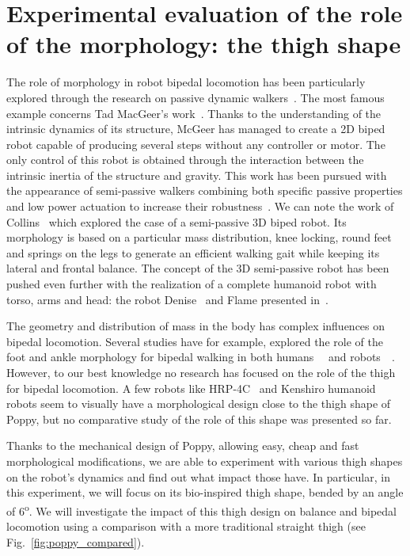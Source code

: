
\newpage
\section{Experimental evaluation of the role of the morphology: the thigh shape} %
\label{sec:morphology-role}

The role of morphology in robot bipedal locomotion has been particularly explored through the research on passive dynamic walkers~\cite{wisse2007passive}. The most famous example concerns Tad MacGeer's work~\cite{mcgeer1990passive}. Thanks to the understanding of the intrinsic dynamics of its structure, McGeer has managed to create a 2D biped robot capable of producing several steps without any controller or motor.
The only control of this robot is obtained through the interaction between the intrinsic inertia of the structure and gravity.
This work has been pursued with the appearance of semi-passive walkers combining both specific passive properties and low power actuation to increase their robustness~\cite{Anderson2005}. We can note the work of Collins~\cite{collins2005bipedal} which explored the case of a semi-passive 3D biped robot. Its morphology is based on a particular mass distribution, knee locking, round feet and springs on the legs to generate an efficient walking gait while keeping its lateral and frontal balance.
The concept of the 3D semi-passive robot has been pushed even further with the realization of a complete humanoid robot with torso, arms and head: the robot Denise~\cite{wisse2005three} and Flame presented in~\cite{Hobbelen2008}.

The geometry and distribution of mass in the body has complex influences on bipedal locomotion. Several studies have for example, explored the role of the foot and ankle morphology for bipedal walking in both humans~\cite{Adamczyk2006}~\cite{Hughes1990} and robots~\cite{hobbelen2005ankle}~\cite{Davis2010}. However, to our best knowledge no research has focused on the role of the thigh for bipedal locomotion.  A few robots like HRP-4C~\cite{kaneko2009cybernetic} and Kenshiro humanoid~\cite{nakanishi2013design} robots seem to visually have a morphological design close to the thigh shape of Poppy, but no comparative study of the role of this shape was presented so far.

Thanks to the mechanical design of Poppy, allowing easy, cheap and fast morphological modifications, we are able to experiment with various thigh shapes on the robot’s dynamics and find out what impact those have. In particular, in this experiment, we will focus on its bio-inspired thigh shape, bended by an angle of 6\textsuperscript{o}. We will investigate the impact of this thigh design on balance and bipedal locomotion using a comparison with a more traditional straight thigh (see Fig.~\ref{fig:poppy_compared}).

